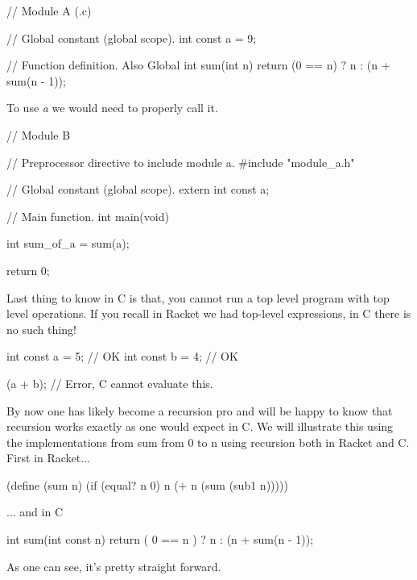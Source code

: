 \begin{code}[C]
// Module A (.c)

// Global constant (global scope).
int const a = 9;

// Function definition.  Also Global
int sum(int n) 
{
	return (0 == n) ? n : (n + sum(n - 1));
}
\end{code}

To use \emph{a} we would need to properly call it.\\

\begin{code}[C]
// Module B

// Preprocessor directive to include module a.
#include "module_a.h"

// Global constant (global scope).
extern int const a;

// Main function.
int main(void)
{
	int sum_of_a = sum(a);	
	
	return 0;
}
\end{code}

Last thing to know in C is that, you cannot run a top level program with top level operations.  If you recall in Racket we had top-level expressions, in C there is no such thing!\\

\begin{code}[C]
int const a = 5; // OK
int const b = 4; // OK

(a + b); // Error, C cannot evaluate this.
\end{code}


By now one has likely become a recursion pro and will be happy to know that recursion works exactly as one would expect in C.  We will illustrate this using the implementations from sum from 0 to n using recursion both in Racket and C.\\

First in Racket...\\
\begin{code}[Lisp]
(define (sum n)
	(if (equal? n 0) n (+ n (sum (sub1 n)))))
\end{code}

... and in C\\
\begin{code}[C]
int sum(int const n)
{
	return ( 0 == n ) ? n : (n + sum(n - 1));
}
\end{code}

As one can see, it's pretty straight forward.\\




 



 